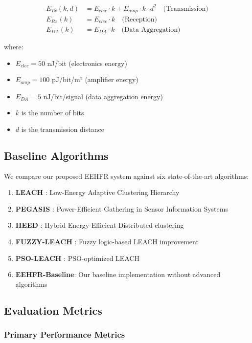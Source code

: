 \documentclass[conference]{IEEEtran}
\begin{document}
\begin{align}
E_{Tx}(k, d) &= E_{elec} \cdot k + E_{amp} \cdot k \cdot d^2 \quad \text{(Transmission)} \\
E_{Rx}(k) &= E_{elec} \cdot k \quad \text{(Reception)} \\
E_{DA}(k) &= E_{DA} \cdot k \quad \text{(Data Aggregation)}
\end{align}

where:
\begin{itemize}
    \item $E_{elec} = 50$ nJ/bit (electronics energy)
    \item $E_{amp} = 100$ pJ/bit/m² (amplifier energy)
    \item $E_{DA} = 5$ nJ/bit/signal (data aggregation energy)
    \item $k$ is the number of bits
    \item $d$ is the transmission distance
\end{itemize}

\subsection{Baseline Algorithms}

We compare our proposed EEHFR system against six state-of-the-art algorithms:

\begin{enumerate}
    \item \textbf{LEACH} \cite{heinzelman2000energy}: Low-Energy Adaptive Clustering Hierarchy
    \item \textbf{PEGASIS} \cite{lindsey2002pegasis}: Power-Efficient Gathering in Sensor Information Systems
    \item \textbf{HEED} \cite{younis2004heed}: Hybrid Energy-Efficient Distributed clustering
    \item \textbf{FUZZY-LEACH} \cite{bagci2013fuzzy}: Fuzzy logic-based LEACH improvement
    \item \textbf{PSO-LEACH} \cite{latiff2007energy}: PSO-optimized LEACH
    \item \textbf{EEHFR-Baseline}: Our baseline implementation without advanced algorithms
\end{enumerate}

\subsection{Evaluation Metrics}

\subsubsection{Primary Performance Metrics}
\end{document}
